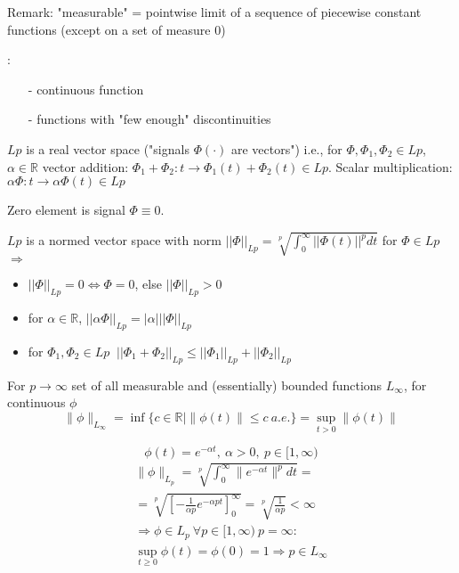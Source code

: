 Remark: "measurable" = pointwise limit of a sequence of piecewise constant functions
(except on a set of measure 0)

\begin{Example}:

\begin{itemize}
 \item[-] continuous function
 \item[-] functions with "few enough" discontinuities
\end{itemize}
\end{Example}

$Lp$ is a real vector space ("signals $\Phi(\cdot)$ are vectors") i.e., for 
$\Phi, \Phi_1, \Phi_2 \in Lp$, $\alpha \in \mathbb{R}$ vector addition:
$\Phi_1+\Phi_2:t \rightarrow \Phi_1(t)+\Phi_2(t) \in Lp$. Scalar multiplication:
$\alpha \Phi:t\rightarrow \alpha\Phi(t) \in Lp$

Zero element is signal $\Phi \equiv 0$.

$Lp$ is a normed vector space with norm $||\Phi||_{Lp}=\sqrt[p]{\int_0^\infty ||\Phi(t)||^p dt}$
for $\Phi \in Lp$ $\Rightarrow$
\begin{itemize}
 \item $||\Phi||_{Lp}=0 \iff \Phi=0$, else $||\Phi||_{Lp}>0$
 \item for $\alpha \in \mathbb{R}$, $||\alpha\Phi||_{Lp}=|\alpha| ||\Phi||_{Lp}$
 \item for $\Phi_1, \Phi_2 \in Lp\ $ $||\Phi_1+\Phi_2||_{Lp} \le ||\Phi_1||_{Lp}+||\Phi_2||_{Lp}$
\end{itemize}

For $p \to \infty$ set of all measurable and (essentially) bounded functions $L_{\infty}$, for continuous $\phi$ 
\begin{equation*}
\|\phi\|_{L_{\infty}} = \inf \{ c \in \mathbb{R} | \|\phi(t)\| \leq c\ a.e.\} = \sup_{t > 0} \| \phi(t)\|
\end{equation*}

\begin{Example}
\begin{equation*}
\phi (t) = e^{- \alpha t}, \ \alpha > 0, \ p \in [1,\infty )
\end{equation*}
\begin{equation*}
\begin{split}
\|\phi \|_{L_p} = \sqrt[p]{\int_0^{\infty} \|e^{-\alpha t}\|^p dt} = \\
= \sqrt[p]{[-\frac{1}{\alpha p}e^{-\alpha pt}]_0^{\infty}} = \sqrt[p]{\frac{1}{\alpha p}} < \infty \\
\Rightarrow \phi \in L_p \ \forall p \in [1, \infty) \ p= \infty : \\
\sup_{t \geq 0} \phi (t) = \phi (0) = 1 \Rightarrow p \in L_{\infty}
\end{split}
\end{equation*}
\end{Example}

